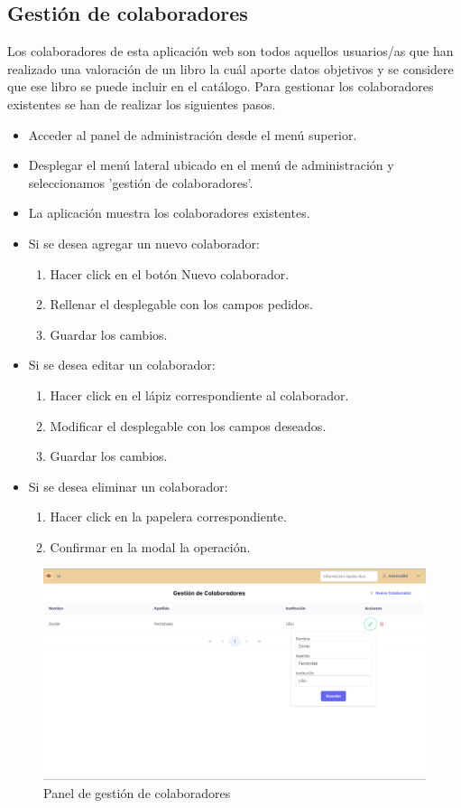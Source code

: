 \subsection{Gestión de colaboradores}
Los colaboradores de esta aplicación web son todos aquellos usuarios/as que han realizado una valoración de un libro la cuál aporte datos objetivos y se considere que ese libro se puede incluir en el catálogo. Para gestionar los colaboradores existentes se han de realizar los siguientes pasos.
\begin{itemize}
    \item Acceder al panel de administración desde el menú superior.
    \item Desplegar el menú lateral ubicado en el menú de administración y seleccionamos 'gestión de colaboradores'.
    \item La aplicación muestra los colaboradores existentes.
    \item Si se desea agregar un nuevo colaborador:
    \begin{enumerate}
        \item Hacer click en el botón Nuevo colaborador.
        \item Rellenar el desplegable con los campos pedidos.
        \item Guardar los cambios.
    \end{enumerate}
    \item Si se desea editar un colaborador:
    \begin{enumerate}
        \item Hacer click en el lápiz correspondiente al colaborador.
        \item Modificar el desplegable con los campos deseados.
        \item Guardar los cambios.
    \end{enumerate}
    \item Si se desea eliminar un colaborador:
    \begin{enumerate}
        \item Hacer click en la papelera correspondiente.
        \item Confirmar en la modal la operación.
    \end{enumerate}
\end{itemize}
\begin{figure}[h]
    \centering
    \includegraphics[width=1\linewidth]{Imagenes/ManualColaboraciones.png}
    \caption{Panel de gestión de colaboradores}
    \label{Panel de gestión de colaboradores}
\end{figure}
